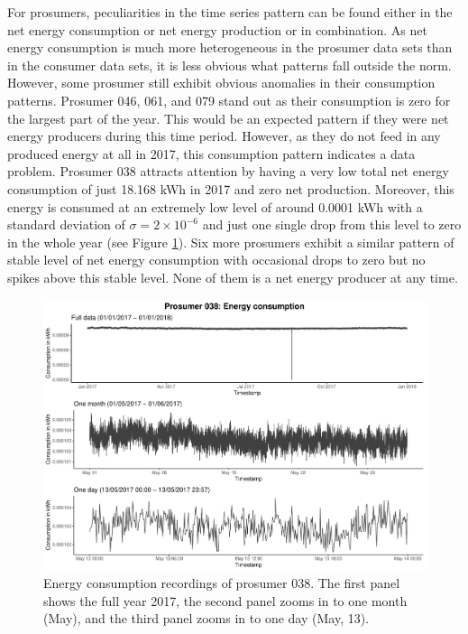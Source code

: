 For prosumers, peculiarities in the time series pattern can be found either in the net energy consumption or net energy production or in combination. As net energy consumption is much more heterogeneous in the prosumer data sets than in the consumer data sets, it is less obvious what patterns fall outside the norm. However, some prosumer still exhibit obvious anomalies in their consumption patterns. Prosumer 046, 061, and 079 stand out as their consumption is zero for the largest part of the year. This would be an expected pattern if they were net energy producers during this time period. However, as they do not feed in any produced energy at all in 2017, this consumption pattern indicates a data problem. 
Prosumer 038 attracts attention by having a very low total net energy consumption of just 18.168 kWh in 2017 and zero net production. Moreover, this energy is consumed at an extremely low level of around 0.0001 kWh with a standard deviation of $\sigma=2\times10^{-6}$ and just one single drop from this level to zero in the whole year (see Figure \ref{Fig:energycons_p038}). Six more prosumers exhibit a similar pattern of stable level of net energy consumption with occasional drops to zero but no spikes above this stable level. None of them is a net energy producer at any time.

\begin{figure}[htbp]
 \centering
\includegraphics[width=\textwidth]{thesis/graphs/timeseries/p038_cons.pdf}
\caption[Energy consumption recordings of prosumer 038]{Energy consumption recordings of prosumer 038. The first panel shows the full year 2017, the second panel zooms in to one month (May), and the third panel zooms in to one day (May, 13). \quantnet}
\label{Fig:energycons_p038}
\end{figure}

